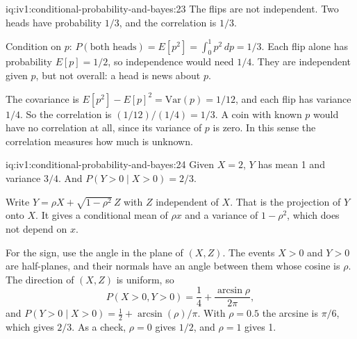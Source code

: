 \begin{solution}{iq:iv1:conditional-probability-and-bayes:23}
The flips are not independent. Two heads have probability $1/3$, and the correlation is $1/3$.

Condition on $p$: $P(\text{both heads}) = E[p^2] = \int_0^1 p^2 \, dp = 1/3$. Each flip alone has probability $E[p] = 1/2$, so independence would need $1/4$. They are independent given $p$, but not overall: a head is news about $p$.

The covariance is $E[p^2] - E[p]^2 = \mathrm{Var}(p) = 1/12$, and each flip has variance $1/4$. So the correlation is $(1/12)/(1/4) = 1/3$. A coin with known $p$ would have no correlation at all, since its variance of $p$ is zero. In this sense the correlation measures how much is unknown.

\end{solution}

\begin{solution}{iq:iv1:conditional-probability-and-bayes:24}
Given $X = 2$, $Y$ has mean 1 and variance $3/4$. And $P(Y > 0 \mid X > 0) = 2/3$.

Write $Y = \rho X + \sqrt{1 - \rho^2}\, Z$ with $Z$ independent of $X$. That is the projection of $Y$ onto $X$. It gives a conditional mean of $\rho x$ and a variance of $1 - \rho^2$, which does not depend on $x$.

For the sign, use the angle in the plane of $(X, Z)$. The events $X > 0$ and $Y > 0$ are half-planes, and their normals have an angle between them whose cosine is $\rho$. The direction of $(X, Z)$ is uniform, so
\[
P(X > 0, Y > 0) = \frac14 + \frac{\arcsin \rho}{2\pi},
\]
and $P(Y > 0 \mid X > 0) = \tfrac12 + \arcsin(\rho)/\pi$. With $\rho = 0.5$ the arcsine is $\pi/6$, which gives $2/3$. As a check, $\rho = 0$ gives $1/2$, and $\rho = 1$ gives 1.

\end{solution}

